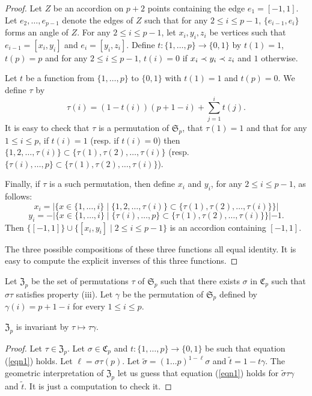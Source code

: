 \documentclass[12pt]{amsart}
\begin{document}
\begin{proof}
Let $Z$ be an accordion on $p+2$ points containing the edge $e_1=[-1,1]$. Let $e_2,\ldots,e_{p-1}$ denote the edges of $Z$ such that for any $2\le i\le p-1$, $\{e_{i-1},e_i\}$ forms an angle of $Z$. For  any $2\le i\le p-1$, let $x_i,y_i,z_i$ be vertices such that $e_{i-1}=[x_i,y_i]$ and $e_i=[y_i,z_i]$. Define $t:\{1,\ldots,p\}\to\{0,1\}$ by $t(1)=1$, $t(p)=p$ and for any $2\le i\le p-1$, $t(i)=0$ if $x_i\prec y_i\prec z_i$ and $1$ otherwise.

Let $t$ be a function from $\{1,\ldots,p\}$ to $\{0,1\}$ with $t(1)=1$ and $t(p)=0$. We define $\tau$ by
\begin{equation}\label{eqn1}\tau(i)=(1-t(i))(p+1-i)+\sum_{j=1}^{i} t(j).\end{equation}
It is easy to check that $\tau$ is a permutation of $\mathfrak{S}_p$, that $\tau(1)=1$ and that for any $1\le i\le p$, if $t(i)=1$ (resp. if $t(i)=0$) then $\{1,2,\ldots,\tau(i)\}\subset\{\tau(1),\tau(2),\ldots,\tau(i)\}$ (resp. $\{\tau(i),\ldots,p\}\subset\{\tau(1),\tau(2),\ldots,\tau(i)\}$).

Finally, if $\tau$ is a such permutation, then define $x_i$ and $y_i$, for any $2\le i\le p-1$, as follows:
$$x_i=|\{x\in\{1,\ldots, i\}\;|\; \{1,2,\ldots,\tau(i)\}\subset\{\tau(1),\tau(2),\ldots,\tau(i)\}\}|$$
$$ y_i=-|\{x\in\{1,\ldots, i\}\;|\; \{\tau(i),\ldots,p\}\subset\{\tau(1),\tau(2),\ldots,\tau(i)\}\}|-1.$$
Then $\{[-1,1]\}\cup\{[x_i,y_i]\;|\; 2\le i\le p-1\}$ is an accordion containing $[-1,1]$.

The three possible compositions of these three functions all equal identity. It is easy to compute the explicit inverses of this three functions.
\end{proof}

Let $\mathfrak{Z}_p$ be the set of permutations $\tau$ of $\mathfrak{S}_p$ such that there exists $\sigma$ in $\mathfrak{C}_p$ such that $\sigma\tau$ satisfies property (iii).
Let $\gamma$ be the permutation of $\mathfrak{S}_p$ defined by $\gamma(i)=p+1-i$ for every $1\le i\le p$.

\begin{lemma}
$\mathfrak{Z}_p$ is invariant by $\tau\mapsto \tau\gamma$. 
\end{lemma}

\begin{proof}
Let $\tau\in\mathfrak{Z}_p$. Let $\sigma\in\mathfrak{C}_p$ and $t:\{1,\ldots,p\}\to\{0,1\}$ be such that equation (\ref{eqn1}) holds.
Let $\ell=\sigma\tau(p)$. Let $\tilde{\sigma}=(1\ldots p)^{1-\ell}\sigma$ and $\tilde{t}=1-t\gamma$.
The geometric interpretation of $\mathfrak{Z}_p$ let us guess that equation (\ref{eqn1}) holds for $\tilde{\sigma}\tau\gamma$ and $\tilde{t}$. It is just a computation to check it.
\end{proof}
\end{document}
